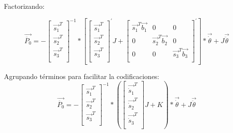         Factorizando:
        
         \[ \overrightarrow{\ddot{P_{0}}}=- \left[ \begin{matrix}
        \overrightarrow{s_{1}}^{T}\\
        \overrightarrow{s_{2}}^{T}\\
        \overrightarrow{s_{3}}^{T}\\
        \end{matrix}
         \right] ^{-1}\ast \left[  \left[ \begin{matrix}
        \overrightarrow{s_{1}}^{T}\\
        \overrightarrow{s_{2}}^{T}\\
        \overrightarrow{s_{3}}^{T}\\
        \end{matrix}
         \right] ^{'} J+ \left[ \begin{matrix}
        \overrightarrow{s_{1}}^{T}\overrightarrow{b_{1}}  &  0  &  0\\
        0  &  \overrightarrow{s_{2}}^{T}\overrightarrow{b_{2}}  &  0\\
        0  &  0  &  \overrightarrow{s_{3}}^{T}\overrightarrow{b_{3}}\\
        \end{matrix}
         \right] ^{'} \right] \ast\overrightarrow{\dot{ \theta }}+J\overrightarrow{\ddot{ \theta }}~ \] 
        
        Agrupando términos para facilitar la codificaciones:
        \begin{equation}
         \overrightarrow{\ddot{P_{0}}}=- \left[ \begin{matrix}
        \overrightarrow{s_{1}}^{T}\\
        \overrightarrow{s_{2}}^{T}\\
        \overrightarrow{s_{3}}^{T}\\
        \end{matrix}
         \right] ^{-1}\ast \left(  \left[ \begin{matrix}
        \overrightarrow{\dot{s}_{1}}^{T}\\
        \overrightarrow{\dot{s}_{2}}^{T}\\
        \overrightarrow{\dot{s}_{3}}^{T}\\
        \end{matrix}
         \right]  J+K \right) \ast\overrightarrow{\dot{ \theta }}+J\overrightarrow{\ddot{ \theta }}~ 
        \label{eq:acelanexobmetodo}
        \end{equation}

